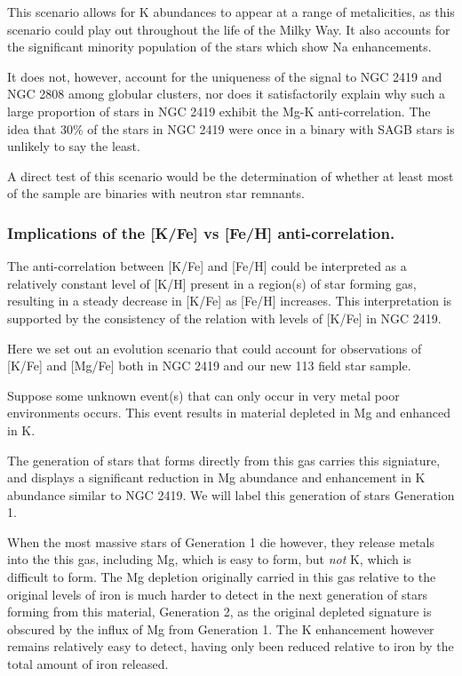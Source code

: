 \documentclass[a4paper,fleqn,usenatbib]{mnras}
\begin{document}
This scenario allows for K abundances to appear at a range of metalicities, as this scenario could play out throughout the life of the Milky Way. It also  accounts for the significant minority population of the stars which show Na enhancements.

It does not, however, account for the uniqueness of the signal to NGC 2419 and NGC 2808 among globular clusters, nor does it satisfactorily explain why such a large proportion of stars in NGC 2419 exhibit the Mg-K anti-correlation. The idea that 30\% of the stars in NGC 2419 were once in a binary with SAGB stars is unlikely to say the least. 

A direct test of this scenario would be the determination of whether at least most of the sample are binaries with neutron star remnants.

\subsubsection{Implications of the [K/Fe] vs [Fe/H] anti-correlation.}

The anti-correlation between [K/Fe] and [Fe/H] could be interpreted as a relatively constant level of [K/H] present in a region(s) of star forming gas, resulting in a steady decrease in [K/Fe] as [Fe/H] increases. This interpretation is supported by the consistency of the relation with levels of [K/Fe] in NGC 2419.

Here we set out an evolution scenario that could account for observations of [K/Fe] and [Mg/Fe] both in NGC 2419 and our new 113 field star sample.

Suppose some unknown event(s) that can only occur in very metal poor environments occurs. This event results in material depleted in Mg and enhanced in K.

The generation of stars that forms directly from this gas carries this signiature, and displays a significant reduction in Mg abundance and enhancement in K abundance similar to NGC 2419. We will label this generation of stars Generation 1.

When the most massive stars of Generation 1 die however, they release metals into the this gas, including Mg, which is easy to form, but \textit{not} K, which is difficult to form. The Mg depletion originally carried in this gas relative to the original levels of iron is much harder to detect in the next generation of stars forming from this material, Generation 2, as the original depleted signature is obscured by the influx of Mg from Generation 1. The K enhancement however remains relatively easy to detect, having only been reduced relative to iron by the total amount of iron released.
\end{document}
